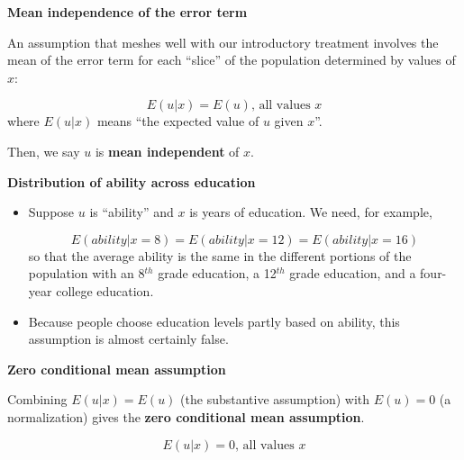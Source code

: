 \documentclass[notes=show]{beamer}
\begin{document}
\begin{frame}[plain]
\begin{center}
\textbf{Mean independence of the error term}
\end{center}


 An assumption that meshes well with our introductory treatment involves the mean of the error term for each ``slice'' of the population determined by values of $x$:

 \begin{equation}
  E(u|x)=E(u)\text{, all values }x
 \end{equation}
 where $E(u|x)$ means ``the expected value of $u$ given $x$''.

 Then, we say $u$ is \textbf{mean independent} of $x$.

\end{frame}

\begin{frame}[plain]
\begin{center}
\textbf{Distribution of ability across education}
\end{center}


\begin{itemize}
 
  \item Suppose $u$ is ``ability'' and $x$ is years of education. We need, for example,

   \begin{equation*}
    E(ability|x=8)=E(ability|x=12)=E(ability|x=16)
   \end{equation*}
  so that the average ability is the same in the different portions of the population with an 8$^{th}$ grade education, a 12$^{th}$ grade education, and a four-year college education.

  \item Because people choose education levels partly based on ability, this assumption is almost certainly false.
 
 \end{itemize}
 
\end{frame}

\begin{frame}[plain]
\begin{center}
\textbf{Zero conditional mean assumption}
\end{center}

 Combining $E(u|x)=E(u)$ (the substantive assumption) with $E(u)=0$ (a normalization) gives the \textbf{zero conditional mean assumption}.

 \begin{equation}
  E(u|x)=0\text{, all values }x
 \end{equation}

\end{frame}
\end{document}
